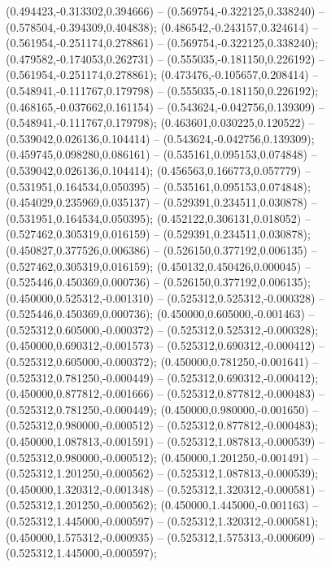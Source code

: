  (0.494423,-0.313302,0.394666) -- (0.569754,-0.322125,0.338240) -- (0.578504,-0.394309,0.404838);
 (0.486542,-0.243157,0.324614) -- (0.561954,-0.251174,0.278861) -- (0.569754,-0.322125,0.338240);
 (0.479582,-0.174053,0.262731) -- (0.555035,-0.181150,0.226192) -- (0.561954,-0.251174,0.278861);
 (0.473476,-0.105657,0.208414) -- (0.548941,-0.111767,0.179798) -- (0.555035,-0.181150,0.226192);
 (0.468165,-0.037662,0.161154) -- (0.543624,-0.042756,0.139309) -- (0.548941,-0.111767,0.179798);
 (0.463601,0.030225,0.120522) -- (0.539042,0.026136,0.104414) -- (0.543624,-0.042756,0.139309);
 (0.459745,0.098280,0.086161) -- (0.535161,0.095153,0.074848) -- (0.539042,0.026136,0.104414);
 (0.456563,0.166773,0.057779) -- (0.531951,0.164534,0.050395) -- (0.535161,0.095153,0.074848);
 (0.454029,0.235969,0.035137) -- (0.529391,0.234511,0.030878) -- (0.531951,0.164534,0.050395);
 (0.452122,0.306131,0.018052) -- (0.527462,0.305319,0.016159) -- (0.529391,0.234511,0.030878);
 (0.450827,0.377526,0.006386) -- (0.526150,0.377192,0.006135) -- (0.527462,0.305319,0.016159);
 (0.450132,0.450426,0.000045) -- (0.525446,0.450369,0.000736) -- (0.526150,0.377192,0.006135);
 (0.450000,0.525312,-0.001310) -- (0.525312,0.525312,-0.000328) -- (0.525446,0.450369,0.000736);
 (0.450000,0.605000,-0.001463) -- (0.525312,0.605000,-0.000372) -- (0.525312,0.525312,-0.000328);
 (0.450000,0.690312,-0.001573) -- (0.525312,0.690312,-0.000412) -- (0.525312,0.605000,-0.000372);
 (0.450000,0.781250,-0.001641) -- (0.525312,0.781250,-0.000449) -- (0.525312,0.690312,-0.000412);
 (0.450000,0.877812,-0.001666) -- (0.525312,0.877812,-0.000483) -- (0.525312,0.781250,-0.000449);
 (0.450000,0.980000,-0.001650) -- (0.525312,0.980000,-0.000512) -- (0.525312,0.877812,-0.000483);
 (0.450000,1.087813,-0.001591) -- (0.525312,1.087813,-0.000539) -- (0.525312,0.980000,-0.000512);
 (0.450000,1.201250,-0.001491) -- (0.525312,1.201250,-0.000562) -- (0.525312,1.087813,-0.000539);
 (0.450000,1.320312,-0.001348) -- (0.525312,1.320312,-0.000581) -- (0.525312,1.201250,-0.000562);
 (0.450000,1.445000,-0.001163) -- (0.525312,1.445000,-0.000597) -- (0.525312,1.320312,-0.000581);
 (0.450000,1.575312,-0.000935) -- (0.525312,1.575313,-0.000609) -- (0.525312,1.445000,-0.000597);
